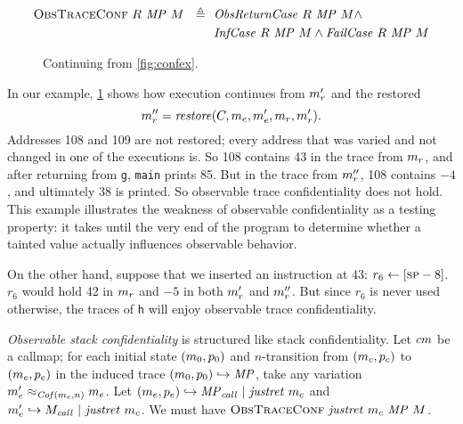 \documentclass[acmsmall,review,anonymous]{acmart}\settopmatter{printfolios=true,printccs=false,printacmref=false}
\begin{document}
{{      \[\begin{split}
        \text{\sc ObsTraceConf} ~  R ~ \mathit{MP} ~ M \ \ \triangleq \ \
        & \mathit{ObsReturnCase} ~ R ~ \mathit{MP} ~ M \land \\
        & \mathit{InfCase} ~ R ~ \mathit{MP} ~ M \land \mathit{FailCase} ~ R ~
          \mathit{MP} ~ M \\
      \end{split}\]

      \begin{figure}
        \confidentialitylazyexample
        \caption{Continuing from \cref{fig:confex}.}
        \label{fig:conflex}
      \end{figure}

      In our example, \cref{fig:conflex} shows how execution continues from
      \(m_r'\) and the restored
      \[m_r'' = \mathit{restore}(C,
      m_e,m_e',m_r,m_r').
      \]
      Addresses 108 and 109
      are not restored; every address that was varied and not changed in one
      of the executions is. So 108 contains 43 in the trace from \(m_r\),
      and after returning from {\tt g}, {\tt main} prints 85. But in the trace
      from \(m_r''\), 108 contains $-4$, and ultimately 38 is printed.
      So observable trace confidentiality does not hold. This example
      illustrates the weakness of observable confidentiality as a testing
      property: it takes until the very end of the program to determine whether
      a tainted value actually influences observable behavior.

      On the other hand, suppose that we inserted an instruction at 43:
      \(r_6 \leftarrow [\textsc{sp}-8]\). \(r_6\) would hold 42 in \(m_r\)
      and $-5$ in both \(m_r'\) and \(m_r''\). But since \(r_6\) is
      never used otherwise, the traces of {\tt h} will enjoy observable trace
      confidentiality.


      {\em Observable stack confidentiality} is structured like stack
      confidentiality. Let \(cm\) be a callmap; for each initial
      state \((m_0, p_0)\) and \(n\)-transition from \((m_c,p_c)\)
      to \((m_e,p_e)\) in the induced trace
      \((m_0,p_0) \hookrightarrow \mathit{MP}\), take any
      variation \(m_e' \approx_{\mathit{Cof}(m_c,n)} m_e\). Let
      \((m_e,p_e) \hookrightarrow \mathit{MP}_{\mathit{call}} ~ | ~
      \mathit{justret}\ m_c\) and \(m_e' \hookrightarrow M_{\mathit{call}} ~ | ~
      \mathit{justret}\ m_c\). We must have \(\text{\sc ObsTraceConf} ~
      \mathit{justret}\ m_c ~ \mathit{MP} ~ M\).

}}
\end{document}
